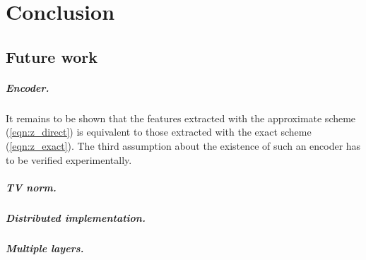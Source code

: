 \documentclass[a4paper,12pt,oneside]{report}
\newcommand{\eqnref}[1]{(\ref{eqn:#1})}  %
\begin{document}
\chapter*{Conclusion}


\section*{Future work}

\paragraph{Encoder.}
It remains to be shown that the features extracted with the approximate scheme \eqnref{z_direct} is equivalent to those extracted with the exact scheme \eqnref{z_exact}.
The third assumption about the existence of such an encoder has to be verified experimentally. %

\paragraph{TV norm.}

\paragraph{Distributed implementation.}

\paragraph{Multiple layers.}
\end{document}

